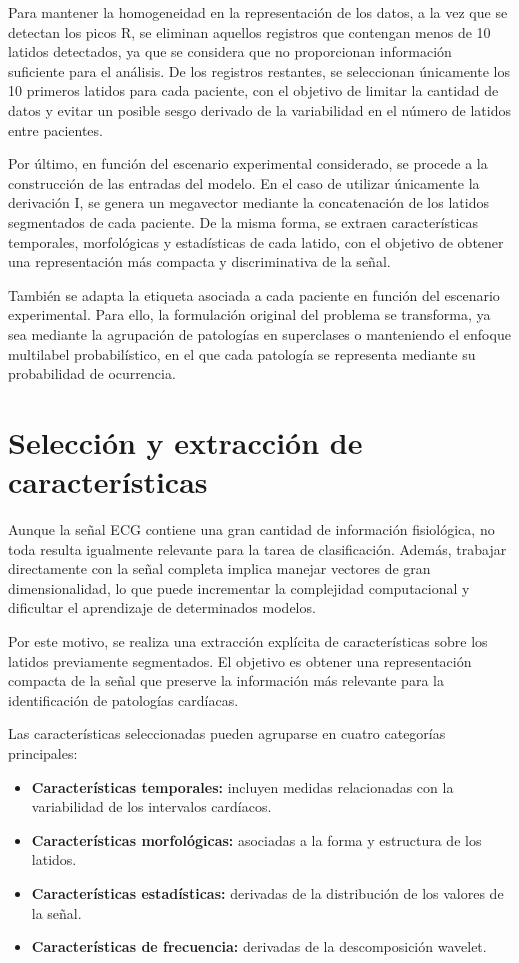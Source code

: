 \documentclass[12pt,a4paper,twoside]{book}
\begin{document}
Para mantener la homogeneidad en la representación de los datos, a la vez que se detectan los picos R, se eliminan aquellos registros que contengan menos de 10 latidos detectados, ya que se considera que no proporcionan información suficiente para el análisis.
De los registros restantes, se seleccionan únicamente los 10 primeros latidos para cada paciente, con el objetivo de limitar la cantidad de datos y evitar un posible sesgo derivado de la variabilidad en el número de latidos entre pacientes.

Por último, en función del escenario experimental considerado, se procede a la construcción de las entradas del modelo. 
En el caso de utilizar únicamente la derivación I, se genera un megavector mediante la concatenación de los latidos segmentados de cada paciente. 
De la misma forma, se extraen características temporales, morfológicas y estadísticas de cada latido, con el objetivo de obtener una representación más compacta y discriminativa de la señal.

También se adapta la etiqueta asociada a cada paciente en función del escenario experimental. 
Para ello, la formulación original del problema se transforma, ya sea mediante la agrupación de patologías en superclases o manteniendo el enfoque multilabel probabilístico, en el que cada patología se representa mediante su probabilidad de ocurrencia.

\section{Selección y extracción de características}

Aunque la señal ECG contiene una gran cantidad de información fisiológica, no toda resulta igualmente relevante para la tarea de clasificación. 
Además, trabajar directamente con la señal completa implica manejar vectores de gran dimensionalidad, lo que puede incrementar la complejidad computacional y dificultar el aprendizaje de determinados modelos.

Por este motivo, se realiza una extracción explícita de características sobre los latidos previamente segmentados. 
El objetivo es obtener una representación compacta de la señal que preserve la información más relevante para la identificación de patologías cardíacas.

Las características seleccionadas pueden agruparse en cuatro categorías principales: 
\begin{itemize}
	\item \textbf{Características temporales:} incluyen medidas relacionadas con la variabilidad de los intervalos cardíacos.
	\item \textbf{Características morfológicas:} asociadas a la forma y estructura de los latidos.
	\item \textbf{Características estadísticas:} derivadas de la distribución de los valores de la señal.
	\item \textbf{Características de frecuencia:} derivadas de la descomposición wavelet.
\end{itemize}
\end{document}
